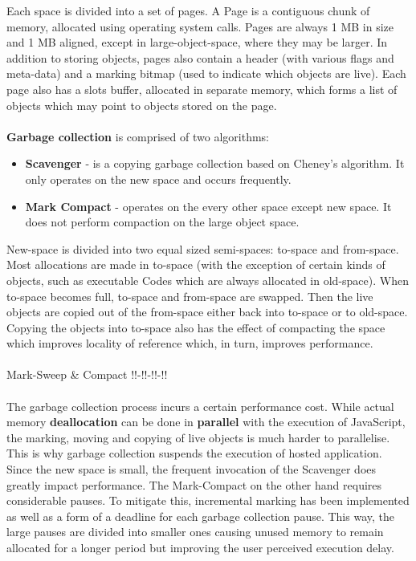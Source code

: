 \documentclass{l4proj}
\begin{document}
Each space is divided into a set of pages. A Page is a contiguous chunk of memory, allocated using operating system calls. Pages are always 1 MB in size and 1 MB aligned, except in large-object-space, where they may be larger. In addition to storing objects, pages also contain a header (with various flags and meta-data) and a marking bitmap (used to indicate which objects are live). Each page also has a slots buffer, allocated in separate memory, which forms a list of objects which may point to objects stored on the page.\cite{v8gctour}
\\\\
\textbf{Garbage collection} is comprised of two algorithms:
\begin{itemize}
\item \textbf{Scavenger} - is a copying garbage collection based on Cheney's algorithm. It only operates on the new space and occurs frequently.
\item \textbf{Mark Compact} - operates on the every other space except new space. It does not perform compaction on the large object space.
\end{itemize}

New-space is divided into two equal sized semi-spaces: to-space and from-space. Most allocations are made in to-space (with the exception of certain kinds of objects, such as executable Codes which are always allocated in old-space). When to-space becomes full, to-space and from-space are swapped. Then the live objects are copied out of the from-space either back into to-space or to old-space. Copying the objects into to-space also has the effect of compacting the space which improves locality of reference which, in turn, improves performance.%
\\\\
Mark-Sweep \& Compact !!-!!-!!-!!
\\\\
\hspace*{3em} The garbage collection process incurs a certain performance cost. While actual memory \textbf{deallocation} can be done in \textbf{parallel} with the execution of JavaScript, the marking, moving and copying of live objects is much harder to parallelise. This is why garbage collection suspends the execution of hosted application. Since the new space is small, the frequent invocation of the Scavenger does greatly impact performance. The Mark-Compact on the other hand requires considerable pauses. To mitigate this, incremental marking has been implemented as well as a form of a deadline for each garbage collection pause. This way, the large pauses are divided into smaller ones causing unused memory to remain allocated for a longer period but improving the user perceived execution delay.
\end{document}
